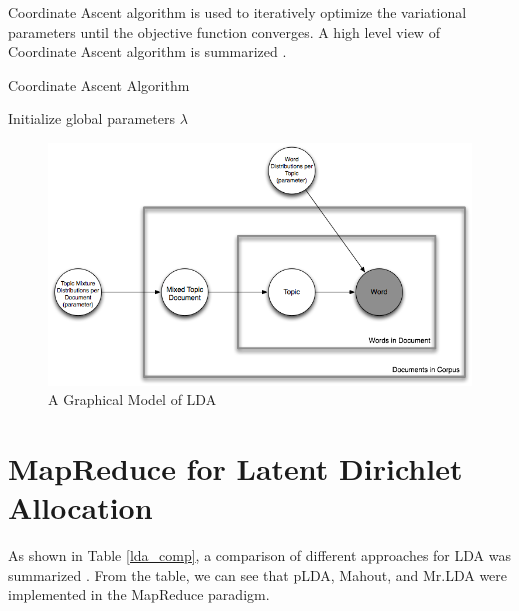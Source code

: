 \documentclass[conference]{IEEEtran}
\begin{document}
Coordinate Ascent algorithm is used to iteratively optimize the variational parameters until the objective function converges. A high level view of Coordinate Ascent algorithm is summarized \cite{caa}. 
\begin{algorithm}
\caption{Coordinate Ascent Algorithm}
\label{alg:lda}
\begin{algorithmic}
    \REQUIRE Initialize global parameters $\lambda$
\REPEAT
    \ENDFOR
    		\ENDFOR    
    \ENDFOR
{}

\end{algorithmic}
\end{algorithm}


\begin{figure}[!t]
\centering
\includegraphics[width=5in]{lda.png}
\caption{A Graphical Model of LDA}
\label{gm_lda}
\end{figure}

\section{MapReduce for Latent Dirichlet Allocation}

As shown in Table \ref{lda_comp}, a comparison of different approaches for LDA was summarized \cite{zhai2012mr}. From the table, we can see that pLDA, Mahout, and Mr.LDA were implemented in the MapReduce paradigm. 
\end{document}
